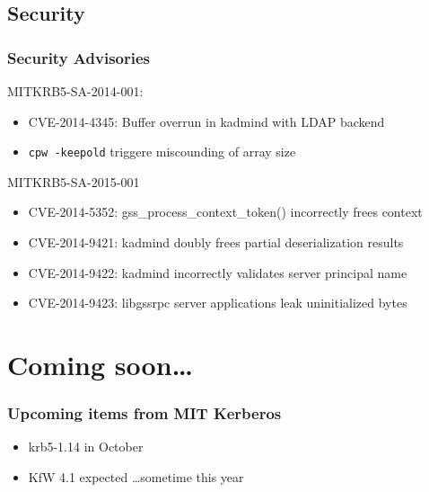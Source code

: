 \documentclass{beamer}
\begin{document}
\subsection{Security}

\begin{frame}[fragile]
\frametitle{Security Advisories}
MITKRB5-SA-2014-001:
\begin{itemize}
\item{CVE-2014-4345: Buffer overrun in kadmind with LDAP backend}
\item{\verb+cpw -keepold+ triggere miscounding of array size}
\end{itemize}
MITKRB5-SA-2015-001
\begin{itemize}
\item{CVE-2014-5352: gss\_process\_context\_token() incorrectly frees context}
\item{CVE-2014-9421: kadmind doubly frees partial deserialization results}
\item{CVE-2014-9422: kadmind incorrectly validates server principal name}
\item{CVE-2014-9423: libgssrpc server applications leak uninitialized bytes}
\end{itemize}
\end{frame}

\section{Coming soon\ldots{}}

\begin{frame}
\frametitle{Upcoming items from MIT Kerberos}
\begin{itemize}
\item{krb5-1.14 in October}
\item{KfW 4.1 expected \ldots sometime this year}
\end{itemize}
\end{frame}
\end{document}
